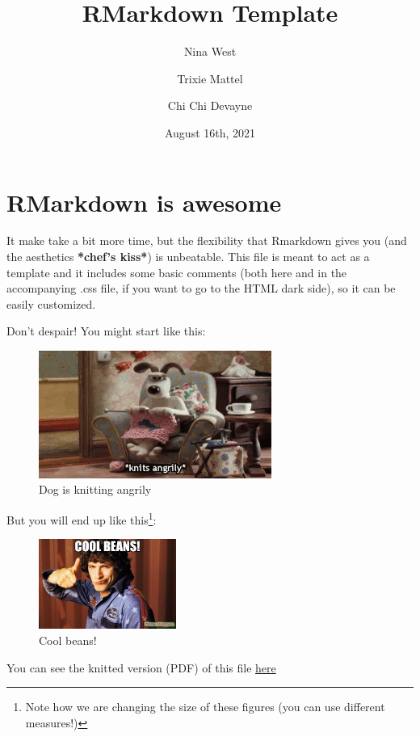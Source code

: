 \documentclass[
]{article}
\title{RMarkdown Template}
\author{Nina West \and Trixie Mattel \and Chi Chi Devayne}
\date{August 16th, 2021}
\begin{document}
\maketitle

\hypertarget{rmarkdown-is-awesome}{%
\section{RMarkdown is awesome}\label{rmarkdown-is-awesome}}

It make take a bit more time, but the flexibility that Rmarkdown gives
you (and the aesthetics \textbf{*chef's kiss*}) is unbeatable. This file
is meant to act as a template and it includes some basic comments (both
here and in the accompanying .css file, if you want to go to the HTML
dark side), so it can be easily customized.

Don't despair! You might start like this:

\begin{figure}
\centering
\includegraphics[width=3in,height=\textheight]{./Rmarkdown/images/knits2.png}
\caption{Dog is knitting angrily}
\end{figure}

But you will end up like this\footnote{Note how we are changing the size
  of these figures (you can use different measures!)}:

\begin{figure}
\centering
\includegraphics[width=0.4\textwidth,height=\textheight]{./Rmarkdown/images/cool_beans.jpeg}
\caption{Cool beans!}
\end{figure}

You can see the knitted version (PDF) of this file
\href{https://www.magdalenabennett.com/files/Rmarkdown_template.pdf}{here}
\end{document}
